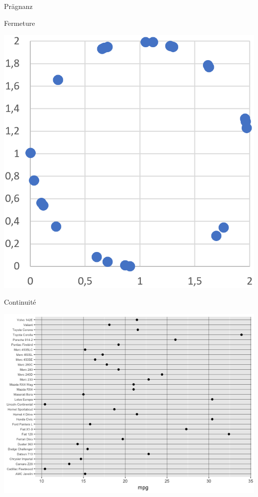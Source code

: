 \documentclass[french]{beamer}
\begin{document}
\begin{frame}{Prägnanz}
\begin{center}
\end{center}
\end{frame}

\begin{frame}{Fermeture}
\begin{center}
	\includegraphics[height=0.8\textheight]{circle}
\end{center}
\end{frame}

\begin{frame}{Continuité}
\begin{center}
	\includegraphics[height=0.8\textheight]{autosloc_rand}
\end{center}
\end{frame}
\end{document}

